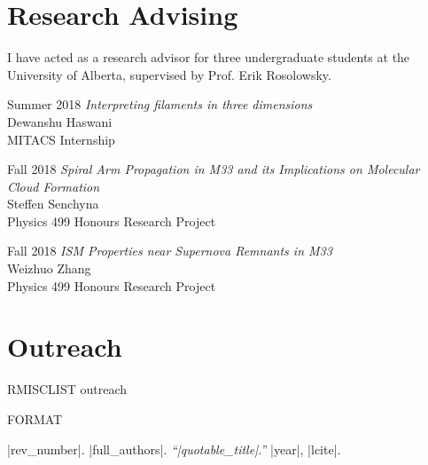 \documentclass[letterpaper,11pt]{article}
\newlength{\mainindent} \setlength{\mainindent}{12pt}
\newlength{\contentindent} \setlength{\contentindent}{19ex}
\newenvironment{datelist}{
  \begingroup
  \raggedright
  \begin{description}[labelindent=\mainindent,leftmargin=\contentindent,
      style=sameline,font=\normalfont,topsep=0pt,partopsep=0pt,parsep=0pt,
      itemsep=4pt]
}{
  \end{description}
  \endgroup
}
\begin{document}
\section*{Research Advising}

I have acted as a research advisor for three undergraduate students at the University of Alberta, supervised by Prof. Erik Rosolowsky.
\vspace{0.1in}
\begin{datelist}
\item[Summer 2018]
  \emph{Interpreting filaments in three dimensions} \\
  Dewanshu Haswani \\
  MITACS Internship
\item[Fall 2018]
  \emph{Spiral Arm Propagation in M33 and its Implications on Molecular Cloud Formation} \\
  Steffen Senchyna \\
  Physics 499 Honours Research Project
\item[Fall 2018]
  \emph{ISM Properties near Supernova Remnants in M33} \\
  Weizhuo Zhang \\
  Physics 499 Honours Research Project
\end{datelist}





\section*{Outreach}
\begin{datelist}
RMISCLIST outreach
\end{datelist}


FORMAT \item[|rev_number|.] |full_authors|. \textit{``|quotable_title|.''} |year|, |lcite|.
\end{document}
